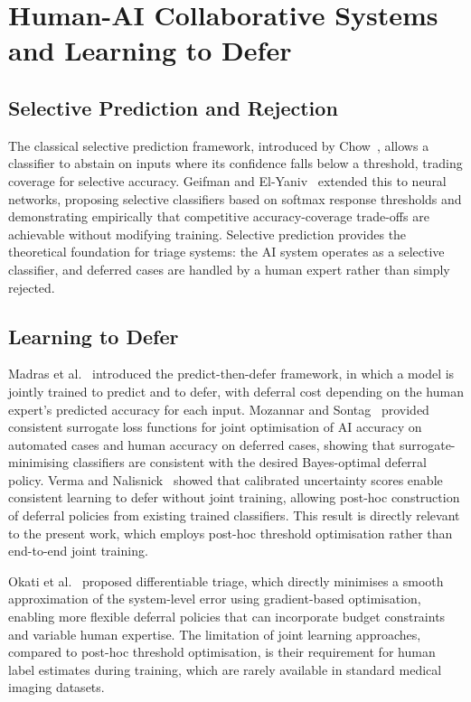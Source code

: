 \section{Human-AI Collaborative Systems and Learning to Defer}

\subsection{Selective Prediction and Rejection}

The classical selective prediction framework, introduced by Chow~\cite{chow1970optimum}, allows a classifier to abstain on inputs where its confidence falls below a threshold, trading coverage for selective accuracy. Geifman and El-Yaniv~\cite{geifman2017selective} extended this to neural networks, proposing selective classifiers based on softmax response thresholds and demonstrating empirically that competitive accuracy-coverage trade-offs are achievable without modifying training. Selective prediction provides the theoretical foundation for triage systems: the AI system operates as a selective classifier, and deferred cases are handled by a human expert rather than simply rejected.

\subsection{Learning to Defer}

Madras et al.~\cite{madras2018predict} introduced the predict-then-defer framework, in which a model is jointly trained to predict and to defer, with deferral cost depending on the human expert's predicted accuracy for each input. Mozannar and Sontag~\cite{mozannar2020consistent} provided consistent surrogate loss functions for joint optimisation of AI accuracy on automated cases and human accuracy on deferred cases, showing that surrogate-minimising classifiers are consistent with the desired Bayes-optimal deferral policy. Verma and Nalisnick~\cite{verma2022calibrated} showed that calibrated uncertainty scores enable consistent learning to defer without joint training, allowing post-hoc construction of deferral policies from existing trained classifiers. This result is directly relevant to the present work, which employs post-hoc threshold optimisation rather than end-to-end joint training.

Okati et al.~\cite{okati2021differentiable} proposed differentiable triage, which directly minimises a smooth approximation of the system-level error using gradient-based optimisation, enabling more flexible deferral policies that can incorporate budget constraints and variable human expertise. The limitation of joint learning approaches, compared to post-hoc threshold optimisation, is their requirement for human label estimates during training, which are rarely available in standard medical imaging datasets.

